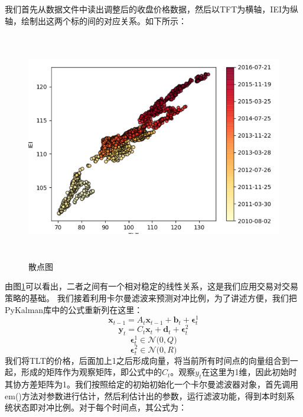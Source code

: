 \documentclass{article}
\begin{document}
我们首先从数据文件中读出调整后的收盘价格数据，然后以TFT为横轴，IEI为纵轴，绘制出这两个标的间的对应关系。如下所示：
\begin{figure}[H]
	\caption{散点图}
	\label{f000056}
	\centering
	\includegraphics[height=10cm]{images/f000056}
\end{figure}
由图\ref{f000056}可以看出，二者之间有一个相对稳定的线性关系，这是我们应用交易对交易策略的基础。\newline
我们接着利用卡尔曼滤波来预测对冲比例，为了讲述方便，我们把PyKalman库中的公式重新列在这里：
\begin{equation}
\boldsymbol{x}_{t-1}=A_{t}\boldsymbol{x}_{t-1} + \boldsymbol{b}_{t} + \boldsymbol{\epsilon}_{t}^{1}
\label{e000077}
\end{equation}
\begin{equation}
\boldsymbol{y}_{t}=C_{t}\boldsymbol{x}_{t} + \boldsymbol{d}_{t} + \boldsymbol{\epsilon}_{t}^{2}
\label{e000078}
\end{equation}
\begin{equation}
\boldsymbol{\epsilon}_{t}^{1} \in \mathcal{N} \big( 0, Q \big)
\label{e000079}
\end{equation}
\begin{equation}
\boldsymbol{\epsilon}_{t}^{2} \in \mathcal{N} \big( 0, R \big)
\label{e000080}
\end{equation}
我们将TLT的价格，后面加上1之后形成向量，将当前所有时间点的向量组合到一起，形成的矩阵作为观察矩阵，即公式中的$C_{t}$。观察$y_{t}$在这里为1维，因此初始时其协方差矩阵为1。我们按照给定的初始初始化一个卡尔曼滤波器对象，首先调用em()方法对参数进行估计，然后利估计出的参数，运行滤波功能，得到本时刻系统状态即对冲比例。对于每个时间点，其公式为：
\end{document}
